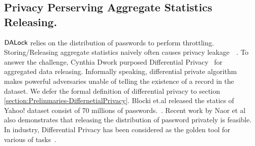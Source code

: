 \subsection{Privacy Perserving Aggregate Statistics Releasing.} \label{related: dp} $\mathsf{DALock}$ relies on the distribution of passwords to perform throttling. Storing/Releasing aggregate statistics naively often causes privacy leakage~\cite{arXiv:NarShm06}~\cite{UTA:NarShm08}. To answer the challenge, Cynthia Dwork purposed Differential Privacy~\cite{ECS:Dwork11} for aggregated data releasing. Informally speaking, differential private algorithm makes powerful adversaries unable of telling the existence of a record in the dataset. We defer the formal definition of differential privacy to section \ref{section:Prelinmaries-DiffernetialPrivacy}. Blocki et.al released the statics of Yahoo! dataset consist of 70 millions of passwords.~\cite{NDSS:BloDatBon16}. Recent work by Naor et al~\cite{CCS:NaoPinRon19} also demonstrates that releasing the distribution of password privately is feasible. In industry, Differential Privacy has been considered as the golden tool for various of tasks~\cite{AppleDP,AppleDPTeam,CCS:ErlPihKor14}.  

